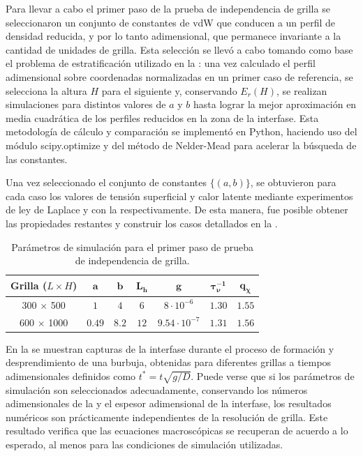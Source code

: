\bigskip
Para llevar a cabo el primer paso de la prueba de independencia de grilla se seleccionaron un conjunto de constantes de vdW que conducen a un perfil de densidad reducida, y por lo tanto adimensional, que permanece invariante a la cantidad de unidades de grilla. Esta selecci\'on se llev\'o a cabo tomando como base el problema de estratificaci\'on utilizado en la : una vez calculado el perfil adimensional sobre coordenadas normalizadas en un primer caso de referencia, se selecciona la altura $H$ para el siguiente y, conservando $E_r(H)$, se realizan simulaciones para distintos valores de $a$ y $b$ hasta lograr la mejor aproximaci\'on en media cuadr\'atica de los perfiles reducidos en la zona de la interfase. Esta metodolog\'ia  de c\'alculo y comparaci\'on se implement\'o en Python, haciendo uso del m\'odulo scipy.optimize y del m\'etodo de Nelder-Mead para acelerar la b\'usqueda de las constantes.

Una vez seleccionado el conjunto de constantes $\{(a,b)\}$, se obtuvieron para cada caso los valores de tensi\'on superficial y calor latente mediante experimentos de ley de Laplace y con la  respectivamente. De esta manera, fue posible obtener las propiedades restantes y construir los casos detallados en la .
\begin{table}[ht]
	\centering
    \begin{tabular}{c c c c c c c}
	    \toprule
        \bf Grilla ($L\times H$) & $\bm{a}$ & $\bm{b}$ & $\bm{L_h}$ & $\bm{g}$ & $\bm{\tau_{\nu}^{-1}}$ & $\bm{q_{\chi}}$ \\
        \midrule
		300 $\times$ 500   & $1$ & $4$ & $6$ & $8\cdot 10^{-6}$ & $1.30$ & $1.55$ \\
		600 $\times$ 1000  & $0.49$ & $8.2$ & $12$ & $9.54\cdot 10^{-7}$ & $1.31$ & $1.56$ \\		
        \bottomrule
	\end{tabular}
	\caption{Par\'ametros de simulaci\'on para el primer paso de prueba de independencia de grilla.}
	\label{tab:gridindep_step1}
\end{table}  

En la  se muestran capturas de la interfase durante el proceso de formaci\'on y desprendimiento de una burbuja, obtenidas para diferentes grillas a tiempos adimensionales definidos como $t^* = t \sqrt{g/D}$. Puede verse que si los par\'ametros de simulaci\'on son seleccionados adecuadamente, conservando los n\'umeros adimensionales de la  y el espesor adimensional de la interfase, los resultados num\'ericos son pr\'acticamente independientes de la resoluci\'on de grilla. Este resultado verifica que las ecuaciones macrosc\'opicas se recuperan de acuerdo a lo esperado, al menos para las condiciones de simulaci\'on utilizadas.

